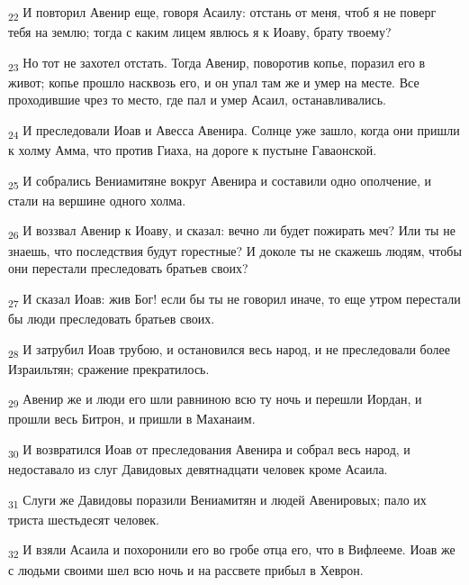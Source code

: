 \begin{tcolorbox}
\textsubscript{22} И повторил Авенир еще, говоря Асаилу: отстань от меня, чтоб я не поверг тебя на землю; тогда с каким лицем явлюсь я к Иоаву, брату твоему?
\end{tcolorbox}
\begin{tcolorbox}
\textsubscript{23} Но тот не захотел отстать. Тогда Авенир, поворотив копье, поразил его в живот; копье прошло насквозь его, и он упал там же и умер на месте. Все проходившие чрез то место, где пал и умер Асаил, останавливались.
\end{tcolorbox}
\begin{tcolorbox}
\textsubscript{24} И преследовали Иоав и Авесса Авенира. Солнце уже зашло, когда они пришли к холму Амма, что против Гиаха, на дороге к пустыне Гаваонской.
\end{tcolorbox}
\begin{tcolorbox}
\textsubscript{25} И собрались Вениамитяне вокруг Авенира и составили одно ополчение, и стали на вершине одного холма.
\end{tcolorbox}
\begin{tcolorbox}
\textsubscript{26} И воззвал Авенир к Иоаву, и сказал: вечно ли будет пожирать меч? Или ты не знаешь, что последствия будут горестные? И доколе ты не скажешь людям, чтобы они перестали преследовать братьев своих?
\end{tcolorbox}
\begin{tcolorbox}
\textsubscript{27} И сказал Иоав: жив Бог! если бы ты не говорил иначе, то еще утром перестали бы люди преследовать братьев своих.
\end{tcolorbox}
\begin{tcolorbox}
\textsubscript{28} И затрубил Иоав трубою, и остановился весь народ, и не преследовали более Израильтян; сражение прекратилось.
\end{tcolorbox}
\begin{tcolorbox}
\textsubscript{29} Авенир же и люди его шли равниною всю ту ночь и перешли Иордан, и прошли весь Битрон, и пришли в Маханаим.
\end{tcolorbox}
\begin{tcolorbox}
\textsubscript{30} И возвратился Иоав от преследования Авенира и собрал весь народ, и недоставало из слуг Давидовых девятнадцати человек кроме Асаила.
\end{tcolorbox}
\begin{tcolorbox}
\textsubscript{31} Слуги же Давидовы поразили Вениамитян и людей Авенировых; пало их триста шестьдесят человек.
\end{tcolorbox}
\begin{tcolorbox}
\textsubscript{32} И взяли Асаила и похоронили его во гробе отца его, что в Вифлееме. Иоав же с людьми своими шел всю ночь и на рассвете прибыл в Хеврон.
\end{tcolorbox}
